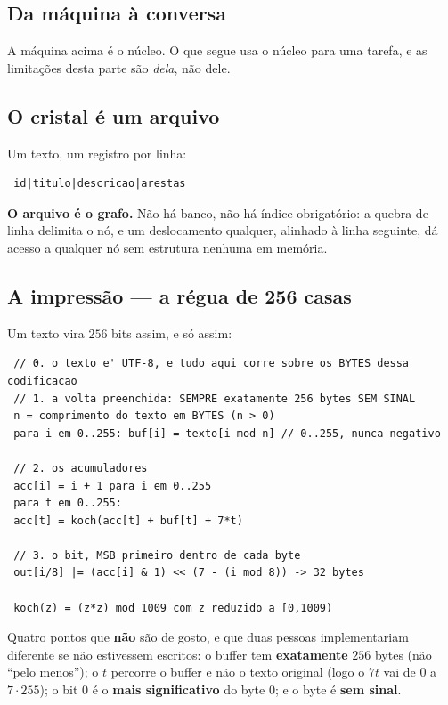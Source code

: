 \documentclass[11pt]{article}
\theoremstyle{plain}
\theoremstyle{remark}
\begin{document}
\subsection{Da máquina à conversa}

A máquina acima é o núcleo. O que segue usa o núcleo para uma tarefa, e as
limitações desta parte são \emph{dela}, não dele.

\subsection{O cristal é um arquivo}

Um texto, um registro por linha:

\begin{verbatim}
 id|titulo|descricao|arestas
\end{verbatim}

\noindent \textbf{O arquivo é o grafo.} Não há banco, não há índice
obrigatório: a quebra de linha delimita o nó, e um deslocamento qualquer,
alinhado à linha seguinte, dá acesso a qualquer nó sem estrutura nenhuma em
memória.

\subsection{A impressão --- a régua de 256 casas}

Um texto vira $256$ bits assim, e só assim:

\begin{verbatim}
 // 0. o texto e' UTF-8, e tudo aqui corre sobre os BYTES dessa codificacao
 // 1. a volta preenchida: SEMPRE exatamente 256 bytes SEM SINAL
 n = comprimento do texto em BYTES (n > 0)
 para i em 0..255: buf[i] = texto[i mod n] // 0..255, nunca negativo

 // 2. os acumuladores
 acc[i] = i + 1 para i em 0..255
 para t em 0..255:
 acc[t] = koch(acc[t] + buf[t] + 7*t)

 // 3. o bit, MSB primeiro dentro de cada byte
 out[i/8] |= (acc[i] & 1) << (7 - (i mod 8)) -> 32 bytes

 koch(z) = (z*z) mod 1009 com z reduzido a [0,1009)
\end{verbatim}

\noindent Quatro pontos que \textbf{não} são de gosto, e que duas pessoas
implementariam diferente se não estivessem escritos: o buffer tem
\textbf{exatamente} $256$ bytes (não ``pelo menos''); o $t$ percorre o buffer e
não o texto original (logo o $7t$ vai de $0$ a $7\cdot255$); o bit $0$ é o
\textbf{mais significativo} do byte $0$; e o byte é \textbf{sem sinal}.
\end{document}
